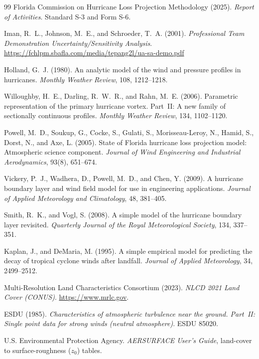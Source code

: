 \documentclass[11pt]{article}
\begin{document}
\begin{thebibliography}{99}
 Florida Commission on Hurricane Loss Projection Methodology (2025).
\emph{Report of Activities}. Standard S-3 and Form S-6.

 Iman, R.~L., Johnson, M.~E., and Schroeder, T.~A. (2001).
\emph{Professional Team Demonstration Uncertainty/Sensitivity Analysis}.
\url{https://fchlpm.sbafla.com/media/tepang2l/ua-sa-demo.pdf}

 Holland, G.~J. (1980). An analytic model of the wind and pressure
profiles in hurricanes. \emph{Monthly Weather Review}, 108, 1212--1218.

 Willoughby, H.~E., Darling, R.~W.~R., and Rahn, M.~E. (2006).
Parametric representation of the primary hurricane vortex. Part~II: A new family of
sectionally continuous profiles. \emph{Monthly Weather Review}, 134, 1102--1120.

 Powell, M.~D., Soukup, G., Cocke, S., Gulati, S.,
Morisseau-Leroy, N., Hamid, S., Dorst, N., and Axe, L. (2005). State of Florida
hurricane loss projection model: Atmospheric science component.
\emph{Journal of Wind Engineering and Industrial Aerodynamics}, 93(8), 651--674.

 Vickery, P.~J., Wadhera, D., Powell, M.~D., and Chen, Y. (2009).
A hurricane boundary layer and wind field model for use in engineering applications.
\emph{Journal of Applied Meteorology and Climatology}, 48, 381--405.

 Smith, R.~K., and Vogl, S. (2008). A simple model of the
hurricane boundary layer revisited. \emph{Quarterly Journal of the Royal
Meteorological Society}, 134, 337--351.

 Kaplan, J., and DeMaria, M. (1995). A simple empirical model for
predicting the decay of tropical cyclone winds after landfall.
\emph{Journal of Applied Meteorology}, 34, 2499--2512.

 Multi-Resolution Land Characteristics Consortium (2023).
\emph{NLCD 2021 Land Cover (CONUS)}. \url{https://www.mrlc.gov}.

 ESDU (1985). \emph{Characteristics of atmospheric turbulence near the
ground. Part~II: Single point data for strong winds (neutral atmosphere)}. ESDU 85020.

 U.S. Environmental Protection Agency.
\emph{AERSURFACE User's Guide}, land-cover to surface-roughness ($z_0$) tables.


\end{thebibliography}
\end{document}
